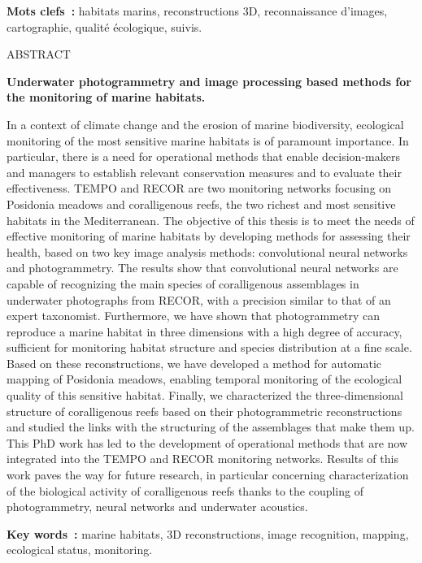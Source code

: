 \noindent\textbf{Mots clefs~: }{habitats marins, reconstructions 3D, reconnaissance d’images, cartographie, qualité écologique, suivis}.
\vskip 0.2cm
\noindent

{\centerline {{\sffamily \Large ABSTRACT}}}

\noindent\textbf{Underwater photogrammetry and image processing based methods for the monitoring of marine habitats.}

\noindent In a context of climate change and the erosion of marine biodiversity, ecological monitoring of the most sensitive marine habitats is of paramount importance. In particular, there is a need for operational methods that enable decision-makers and managers to establish relevant conservation measures and to evaluate their effectiveness. TEMPO and RECOR are two monitoring networks focusing on Posidonia meadows and coralligenous reefs, the two richest and most sensitive habitats in the Mediterranean. The objective of this thesis is to meet the needs of effective monitoring of marine habitats by developing methods for assessing their health, based on two key image analysis methods: convolutional neural networks and photogrammetry. The results show that convolutional neural networks are capable of recognizing the main species of coralligenous assemblages in underwater photographs from RECOR, with a precision similar to that of an expert taxonomist. Furthermore, we have shown that photogrammetry can reproduce a marine habitat in three dimensions with a high degree of accuracy, sufficient for monitoring habitat structure and species distribution at a fine scale. Based on these reconstructions, we have developed a method for automatic mapping of Posidonia meadows, enabling temporal monitoring of the ecological quality of this sensitive habitat. Finally, we characterized the three-dimensional structure of coralligenous reefs based on their photogrammetric reconstructions and studied the links with the structuring of the assemblages that make them up. This PhD work has led to the development of operational methods that are now integrated into the TEMPO and RECOR monitoring networks. Results of this work paves the way for future research, in particular concerning characterization of the biological activity of coralligenous reefs thanks to the coupling of photogrammetry, neural networks and underwater acoustics.

\noindent\textbf{Key words~: }{marine habitats, 3D reconstructions, image recognition, mapping, ecological status, monitoring}.
